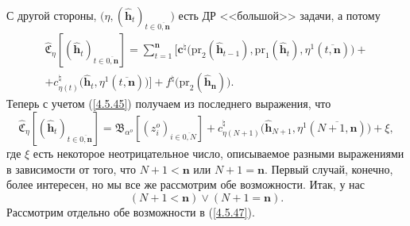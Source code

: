 \documentclass[11pt,twoside,openany]{report}
\newcommand{\bfn}{\begin{equation}}
\newcommand{\efn}{\end{equation}}
\newcommand{\ov}{\overline}
\newcommand{\al}{\alpha}
\begin{document}
{{\begin{eqnarray}
&\label{4.5.45}
\end{eqnarray}
С другой стороны, $\bigl(\eta,(\hat{\mathbf{h}}_t)_{t\in\ov{0,
\mathbf{n}}}\bigl)$ есть ДР <<большой>> задачи, а потому
$$
\begin{array}{c}
\widehat{\mathfrak{C}}_\eta[(\hat{\mathbf{h}}_t)_{t\in\ov{0,\mathbf{n}}}] =
\sum\limits_{t=1}^\mathbf{n}\bigl[\mathbf{c}^\natural\bigl(\mathrm{pr}_2(\hat{\mathbf{h}}_{t-1}),
\mathrm{pr}_1(\hat{\mathbf{h}}_t),\eta^1(\ov{t,\mathbf{n}})\bigl) +
\\
+c_{\eta(t)}^\natural\bigl(\hat{\mathbf{h}}_t,\eta^1(\ov{t,\mathbf{n}})\bigl)\bigl]+
f^\natural\bigl(\mathrm{pr}_2(\hat{\mathbf{h}}_\mathbf{n})\bigl).
\end{array}
$$
Теперь с учетом (\ref{4.5.45}) получаем из последнего выражения, что
\bfn\label{4.5.46}\widehat{\mathfrak{C}}_\eta[(\hat{\mathbf{h}}_t)_{t\in\ov{0,\mathbf{n}}}] =
\mathfrak{B}_{\al^o}[(z_i^o)_{i\in\ov{0,N}}] + c_{\eta(N+1)}^\natural\bigl(\hat{\mathbf{h}}_{N+1},
\eta^1(\ov{N+1,\mathbf{n}})\bigl)  + \xi,
\efn
где $\xi$ есть некоторое неотрицательное число, описываемое разными выражениями в зависимости
от того, что $N+1 <\mathbf{n}$  или $N+1 = \mathbf{n}.$ Первый случай, конечно, более
интересен, но мы все же рассмотрим обе возможности. Итак, у нас
\bfn\label{4.5.47}(N+1 <\mathbf{n}) \vee (N+1 = \mathbf{n}).
\efn
Рассмотрим отдельно обе возможности в (\ref{4.5.47}).

}}
\end{document}
